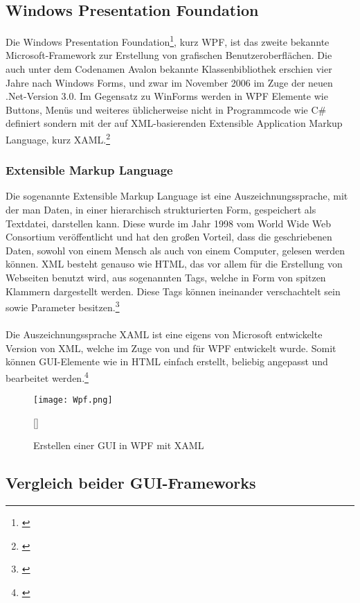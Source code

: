 \subsection{Windows Presentation Foundation}
Die Windows Presentation Foundation\footnote[3]{\cite[Vgl.][]{WPF1}}, kurz WPF, ist das zweite bekannte Microsoft-Framework zur Erstellung von grafischen Benutzeroberflächen. Die auch unter dem Codenamen Avalon bekannte Klassenbibliothek erschien vier Jahre nach Windows Forms, und zwar im November 2006 im Zuge der neuen .Net-Version 3.0. Im Gegensatz zu WinForms werden in WPF Elemente wie Buttons, Menüs und weiteres üblicherweise nicht in Programmcode wie C\# definiert sondern mit der auf XML-basierenden Extensible Application Markup Language, kurz XAML.\footnote[4]{\cite[Vgl.][]{WPF2}}

\subsubsection{Extensible Markup Language}
Die sogenannte Extensible Markup Language ist eine Auszeichnungssprache, mit der man Daten, in einer hierarchisch strukturierten Form, gespeichert als Textdatei, darstellen kann. Diese wurde im Jahr 1998 vom World Wide Web Consortium veröffentlicht und hat den großen Vorteil, dass die geschriebenen Daten, sowohl von einem Mensch als auch von einem Computer, gelesen werden können. XML besteht genauso wie HTML, das vor allem für die Erstellung von Webseiten benutzt wird, aus sogenannten Tags, welche in Form von spitzen Klammern dargestellt werden. Diese Tags können ineinander verschachtelt sein sowie Parameter besitzen.\footnote[1]{\cite[Vgl.][]{XML}}
\\ \ \\
Die Auszeichnungssprache XAML ist eine eigens von Microsoft entwickelte Version von XML, welche im Zuge von und für WPF entwickelt wurde. Somit können GUI-Elemente wie in HTML einfach erstellt, beliebig angepasst und bearbeitet werden.\footnote[2]{\cite[Vgl.][]{XAML1}}
\\
\begin{figure}[H]
    \centering
    \texttt{[image: Wpf.png]}
    \caption[XAML-Code]{Erstellen einer GUI in WPF mit XAML}[\cite{XAML2}]
\end{figure}

\subsection{Vergleich beider GUI-Frameworks}

